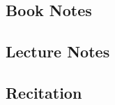 \documentclass[11pt]{article}
\newcommand{\chapterTitle}{}
\begin{document}
\section{\chapterTitle}

\subsection{Book Notes}

\subsection{Lecture Notes}

\subsection{Recitation}
\end{document}
